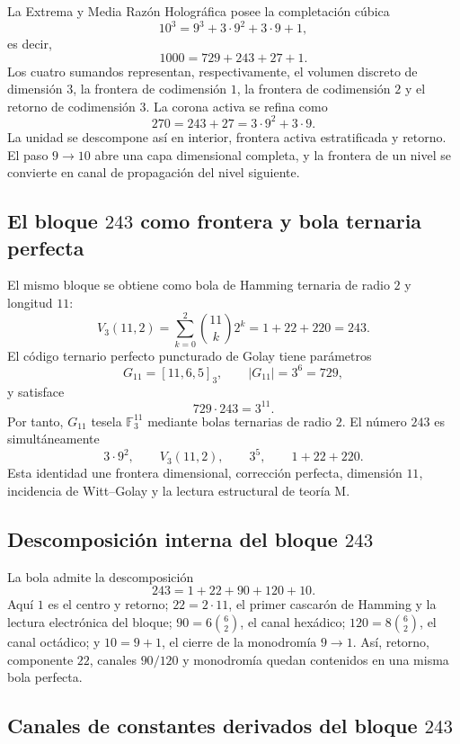 La Extrema y Media Razón Holográfica posee la completación cúbica
\[
10^3=9^3+3\cdot9^2+3\cdot9+1,
\]
es decir,
\[
1000=729+243+27+1.
\]
Los cuatro sumandos representan, respectivamente, el volumen discreto de
dimensión \(3\), la frontera de codimensión \(1\), la frontera de
codimensión \(2\) y el retorno de codimensión \(3\). La corona activa se
refina como
\[
270=243+27=3\cdot9^2+3\cdot9.
\]
La unidad se descompone así en interior, frontera activa estratificada y
retorno. El paso \(9\to10\) abre una capa dimensional completa, y la frontera
de un nivel se convierte en canal de propagación del nivel siguiente.

\subsection{El bloque \texorpdfstring{\(243\)}{243} como frontera y bola ternaria perfecta}

El mismo bloque se obtiene como bola de Hamming ternaria de radio \(2\) y
longitud \(11\):
\[
V_3(11,2)
=\sum_{k=0}^{2}\binom{11}{k}2^k
=1+22+220
=243.
\]
El código ternario perfecto puncturado de Golay tiene parámetros
\[
G_{11}=[11,6,5]_3,
\qquad
|G_{11}|=3^6=729,
\]
y satisface
\[
729\cdot243=3^{11}.
\]
Por tanto, \(G_{11}\) tesela \(\mathbb F_3^{11}\) mediante bolas ternarias de
radio \(2\). El número \(243\) es simultáneamente
\[
3\cdot9^2,
\qquad
V_3(11,2),
\qquad
3^5,
\qquad
1+22+220.
\]
Esta identidad une frontera dimensional, corrección perfecta, dimensión
\(11\), incidencia de Witt--Golay y la lectura estructural de teoría M.

\subsection{Descomposición interna del bloque \texorpdfstring{\(243\)}{243}}

La bola admite la descomposición
\[
243=1+22+90+120+10.
\]
Aquí \(1\) es el centro y retorno; \(22=2\cdot11\), el primer cascarón de
Hamming y la lectura electrónica del bloque; \(90=6\binom62\), el canal hexádico;
\(120=8\binom62\), el canal octádico; y \(10=9+1\), el cierre de la
monodromía \(9\to1\). Así, retorno, componente \(22\), canales \(90/120\) y
monodromía quedan contenidos en una misma bola perfecta.

\subsection{Canales de constantes derivados del bloque \texorpdfstring{\(243\)}{243}}

